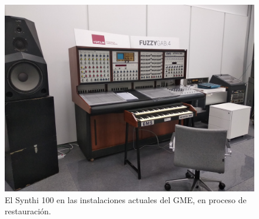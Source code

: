 \begin{figure}
	\centering
	\includegraphics[width=1\textwidth]{synthi_GME_2020}
	\caption[El Synthi 100 en las instalaciones actuales del GME.]{El Synthi 100 en las instalaciones actuales del GME, en proceso de restauración.}
	\label{fig:synthi_GME_2020}
\end{figure}



